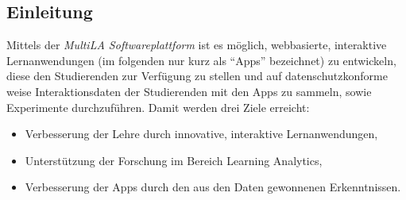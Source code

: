 \documentclass[a0,portrait]{a0poster}
\begin{document}
\vspace{1cm} %


\begin{multicols}{2} %


%
%
%


\color{black}

\section*{Einleitung}

Mittels der \textit{MultiLA Softwareplattform} ist es möglich, webbasierte, interaktive Lernanwendungen (im folgenden nur kurz als \enquote{Apps} bezeichnet) zu entwickeln, diese den Studierenden zur Verfügung zu stellen und auf datenschutzkonforme weise Interaktionsdaten der Studierenden mit den Apps zu sammeln, sowie Experimente durchzuführen. Damit werden drei Ziele erreicht:

\begin{itemize}
    \item Verbesserung der Lehre durch innovative, interaktive Lernanwendungen,
    \item Unterstützung der Forschung im Bereich Learning Analytics,
    \item Verbesserung der Apps durch den aus den Daten gewonnenen Erkenntnissen.
\end{itemize}


\end{multicols}
\end{document}
